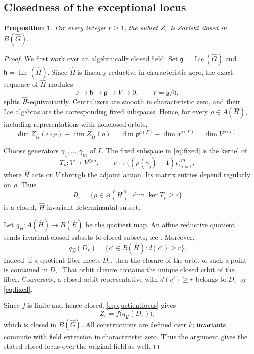 \documentclass[11pt,a4paper]{amsart}
\DeclareMathOperator{\Lie}{Lie}
\newtheorem{proposition}[theorem]{Proposition}
\theoremstyle{definition}
\theoremstyle{remark}
\begin{document}
\subsection{Closedness of the exceptional locus}
\begin{proposition}
For every integer $r\geq1$, the subset $Z_r$ is Zariski closed in $B(\hat G)$.
\end{proposition}
\begin{proof}
We first work over an algebraically closed field. Set
$\mathfrak g=\Lie(\hat G)$ and $\mathfrak h=\Lie(\hat H)$.
Since $\hat H$ is linearly reductive in characteristic zero, the exact sequence
of $\hat H$-modules
$$
0\longrightarrow\mathfrak h\longrightarrow\mathfrak g
\longrightarrow V\longrightarrow0,\qquad V=\mathfrak g/\mathfrak h,
$$
splits $\hat H$-equivariantly. Centralizers are smooth in characteristic zero,
and their Lie algebras are the corresponding fixed subspaces. Hence,
for every $\rho\in A(\hat H)$, including representations with nonclosed orbits,
\begin{equation}\label{eq:fixed}
 \dim Z_{\hat G}(i\circ\rho)-\dim Z_{\hat H}(\rho)
 =\dim\mathfrak g^{\rho(\Gamma)}-\dim\mathfrak h^{\rho(\Gamma)}
 =\dim V^{\rho(\Gamma)}.
\end{equation}

Choose generators $\gamma_1,\ldots,\gamma_m$ of $\Gamma$. The fixed
subspace in \eqref{eq:fixed} is the kernel of
$$
 T_\rho:V\longrightarrow V^{\oplus m},\qquad
 v\longmapsto\bigl((\rho(\gamma_j)-1)v\bigr)_{j=1}^m,
$$
where $\hat H$ acts on $V$ through the adjoint action. Its matrix entries depend
regularly on $\rho$. Thus
$$
 D_r=\{\rho\in A(\hat H):\dim\ker T_\rho\geq r\}
$$
is a closed, $\hat H$-invariant determinantal subset.

Let $q_{\hat H}:A( \hat H)\to B(\hat H)$ be the quotient map. An affine reductive quotient
sends invariant closed subsets to closed subsets; see
\cite[Lemma 2.3]{BGM}. Moreover,
\begin{equation}\label{eq:quotientlocus}
 q_{\hat H }(D_r)=\{c'\in B(\hat H):d(c')\geq r\}.
\end{equation}
Indeed, if a quotient fiber meets $D_r$, then the closure of the orbit of
such a point is contained in $D_r$. That orbit closure contains the unique
closed orbit of the fiber. Conversely, a closed-orbit representative with
$d(c')\geq r$ belongs to $D_r$ by \eqref{eq:fixed}.

Since $f$ is finite and hence closed, \eqref{eq:quotientlocus} gives
$$
 Z_r=f\bigl(q_{\hat H}(D_r)\bigr),
$$
which is closed in $B(\hat G)$. All constructions are defined over $k$;
invariants commute with field extension in characteristic zero. Thus the
argument gives the stated closed locus over the original field as well.
\end{proof}
\end{document}
